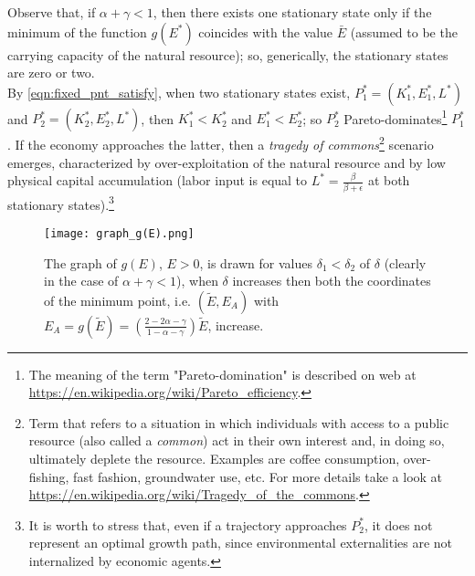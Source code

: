 Observe that, if $\alpha+\gamma<1$, then there exists one stationary state only if the minimum of the function $g(E^*)$ coincides with the value $\bar{E}$ (assumed to be the carrying capacity of the natural resource); so, generically, the stationary states are zero or two.\\
By \eqref{eqn:fixed_pnt_satisfy}, when two stationary states exist, $P_1^* = (K_1^*,E_1^*,L^*)$ and $P_2^* = (K_2^*,E_2^*,L^*)$, then $K_1^* < K_2^*$ and $E_1^* < E_2^*$; so $P_2^*$ Pareto-dominates\footnote{The meaning of the term "Pareto-domination" is described on web at \url{https://en.wikipedia.org/wiki/Pareto_efficiency}.} 
$P_1^*$.
If the economy approaches the latter, then a \textit{tragedy of commons}\footnote{Term that refers to a situation in which individuals with access to a public resource (also called a \textit{common}) act in their own interest and, in doing so, ultimately deplete the resource. Examples are coffee consumption, over-fishing, fast fashion, groundwater use, etc. For more details take a look at \url{https://en.wikipedia.org/wiki/Tragedy_of_the_commons}.} 
scenario emerges, characterized by over-exploitation of the natural resource and by low physical capital accumulation (labor input is equal to $L^* = \frac{\beta}{\beta+\epsilon}$ at both stationary states).\footnote{It is worth to stress that, even if a trajectory approaches $P_2^*$, it does not represent an optimal growth path, since environmental externalities are not internalized by economic agents.}
\begin{figure}
	\centering
	\texttt{[image: graph\_g(E).png]}
	\caption{The graph of $g(E)$, $E>0$, is drawn for values $\delta_1<\delta_2$ of $\delta$ (clearly in the case of $\alpha+\gamma<1$), when $\delta$ increases then both the coordinates of the minimum point, i.e. $(\tilde{E}, E_A)$ with $E_A=g(\tilde{E})=(\frac{2-2\alpha-\gamma}{1-\alpha-\gamma})\tilde{E}$, increase.}
	\label{fig:graph_g(E)}
\end{figure}

